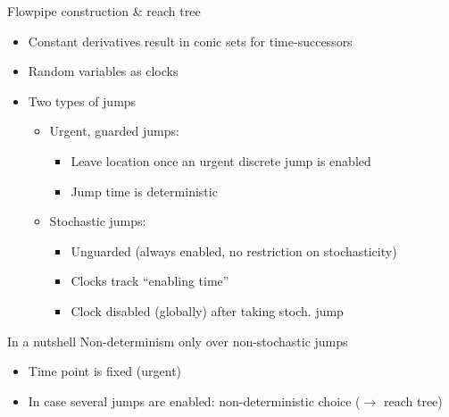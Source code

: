 \documentclass[aspectratio=169]{beamer}
\begin{document}
\begin{frame}{Flowpipe construction \& reach tree}

  \begin{minipage}{.7\linewidth}
    \begin{itemize}
      \item Constant derivatives result in conic sets for time-successors
      \item Random variables as clocks
      \item Two types of jumps
      \begin{itemize}
        \item Urgent, guarded jumps:
          \begin{itemize}
            \item Leave location once an urgent discrete jump is enabled
            \item Jump time is deterministic
          \end{itemize}
          \item Stochastic jumps:
          \begin{itemize}
            \item Unguarded (always enabled, no restriction on stochasticity)
            \item Clocks track \enquote{enabling time}
            \item Clock disabled (globally) after taking stoch. jump
          \end{itemize}
      \end{itemize}
    \end{itemize}
  \end{minipage}%
  \begin{minipage}{.3\linewidth}
      
  \end{minipage}

  \begin{result}{In a nutshell}
    Non-determinism only over non-stochastic jumps
    \begin{itemize}
      \item Time point is fixed (urgent)
      \item In case several jumps are enabled: non-deterministic choice ($\rightarrow$ reach tree)
    \end{itemize}
  \end{result}

\end{frame}

\end{document}
